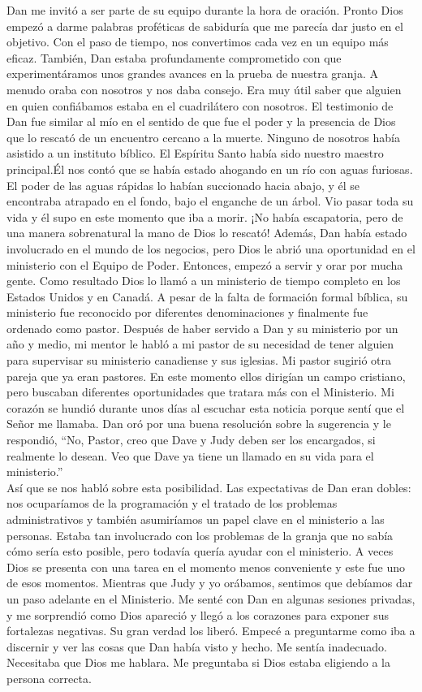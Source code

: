\documentclass[twoside, 12pt]{book}
\begin{document}
Dan me invitó a ser parte de su equipo durante la hora de oración.  Pronto Dios empezó a darme palabras proféticas de sabiduría que me parecía dar justo en el objetivo. Con el paso de tiempo, nos convertimos cada vez en un equipo más eficaz. También, Dan estaba profundamente comprometido con que experimentáramos unos grandes avances en la prueba de nuestra granja. A menudo oraba con nosotros y nos daba consejo. Era muy útil saber que alguien en quien confiábamos estaba en el cuadrilátero con nosotros. El testimonio de Dan fue similar al mío en el sentido de que fue el poder y la presencia de Dios que lo rescató de un encuentro cercano a la muerte. Ninguno de nosotros había asistido a un instituto bíblico. El Espíritu Santo había sido nuestro maestro principal.Él nos contó que se había estado ahogando en un río con aguas furiosas. El poder de las aguas rápidas lo habían succionado hacia abajo, y él se encontraba atrapado en el fondo, bajo el enganche de un árbol. Vio pasar toda su vida y él supo en este momento que iba a morir. ¡No había escapatoria, pero de una manera sobrenatural la mano de Dios lo rescató! Además, Dan había estado involucrado en el mundo de los negocios, pero Dios le abrió una oportunidad en el ministerio con el Equipo de Poder. Entonces, empezó a servir y orar por mucha gente. Como resultado Dios lo llamó a un ministerio de tiempo completo en los Estados Unidos y en Canadá. A pesar de la falta de formación formal bíblica, su ministerio fue reconocido por diferentes denominaciones y finalmente fue ordenado como pastor. Después de haber servido a Dan y su ministerio por un año y medio, mi mentor le habló a mi pastor de su necesidad de tener alguien para supervisar su ministerio canadiense y sus iglesias. Mi pastor sugirió otra pareja que ya eran pastores. En este momento ellos dirigían un campo cristiano, pero buscaban diferentes oportunidades que tratara más con el Ministerio. Mi corazón se hundió durante unos días al escuchar esta noticia porque sentí que el Señor me llamaba. Dan oró por una buena resolución sobre la sugerencia y le respondió, “No, Pastor, creo que Dave y Judy deben ser los encargados, si realmente lo desean. Veo que Dave ya tiene un llamado en su vida para el ministerio.”\\

Así que se nos habló sobre esta posibilidad. Las expectativas de Dan eran dobles:  nos ocuparíamos de la programación y el tratado de los problemas administrativos y también asumiríamos un papel clave en el ministerio a las personas. Estaba tan involucrado con los problemas de la granja que no sabía cómo sería esto posible, pero todavía quería ayudar con el ministerio. A veces Dios se presenta con una tarea en el momento menos conveniente y este fue uno de esos momentos. Mientras que Judy y yo orábamos, sentimos que debíamos dar un paso adelante en el Ministerio. Me senté con Dan en algunas sesiones privadas, y me sorprendió como Dios apareció y llegó a los corazones para exponer sus fortalezas negativas. Su gran verdad los liberó. Empecé a preguntarme como iba a discernir y ver las cosas que Dan había visto y hecho. Me sentía inadecuado.  Necesitaba que Dios me hablara.  Me preguntaba si Dios estaba eligiendo a la persona correcta.\\
\end{document}

